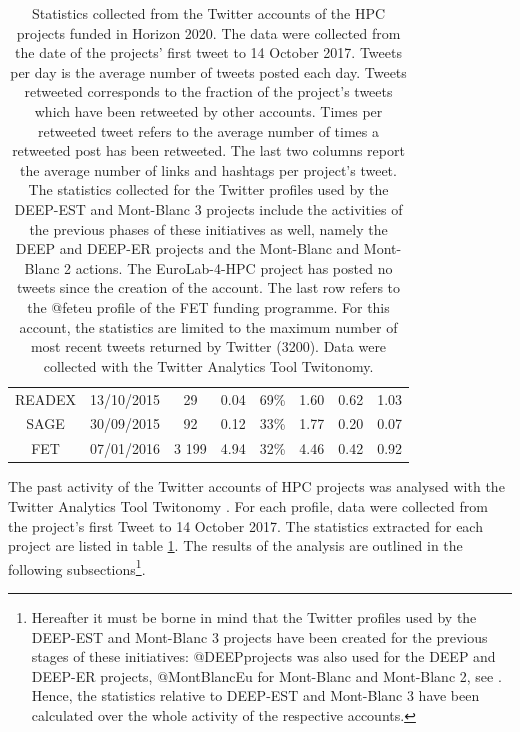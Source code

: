 {\begin{landscape}
\begin{table}
{\begin{tabular}{*{8}{c}}
       READEX & 13/10/2015 & 29 & 0.04 & 69\% & 1.60 & 0.62 & 1.03 \\
       SAGE & 30/09/2015 & 92 & 0.12 & 33\% & 1.77 & 0.20 & 0.07 \\ 
       FET & 07/01/2016 & 3 199 & 4.94 & 32\% & 4.46 & 0.42 & 0.92 \\
       \hline
       \hline
    \end{tabular}
   }     
   \caption{Statistics collected from the Twitter accounts of the HPC projects funded in Horizon 2020. The data were collected from the date of the projects' first tweet to 14 October 2017. Tweets per day is the average number of tweets posted each day. Tweets retweeted corresponds to the fraction of the project's tweets which have been retweeted by other accounts. Times per retweeted tweet refers to the average number of times a retweeted post has been retweeted. The last two columns report the average number of links and hashtags per project's tweet. The statistics collected for the Twitter profiles used by the DEEP-EST and Mont-Blanc 3 projects include the activities of the previous phases of these initiatives as well, namely the DEEP and DEEP-ER projects and the Mont-Blanc and Mont-Blanc 2 actions. The EuroLab-4-HPC project has posted no tweets since the creation of the account. The last row refers to the @fet\textunderscore eu profile of the FET funding programme. For this account, the statistics are limited to the maximum number of most recent tweets returned by Twitter (3200). Data were collected with the Twitter Analytics Tool Twitonomy.} \label{HPC_Twitter_activity}
   \end{table}
   \end{landscape}
 \clearpage
}

The past activity of the Twitter accounts of HPC projects was analysed with the Twitter Analytics Tool Twitonomy \cite{Twitonomy}. For each profile, data were collected from the project's first Tweet to 14 October 2017. The statistics extracted for each project are listed in table \ref{HPC_Twitter_activity}. The results of the analysis are outlined in the following subsections\footnote{Hereafter it must be borne in mind that the Twitter profiles used by the DEEP-EST and Mont-Blanc 3 projects have been created for the previous stages of these initiatives: @DEEPprojects was also used for the DEEP and DEEP-ER projects, @MontBlanc\textunderscore Eu for Mont-Blanc and Mont-Blanc 2, see \cite{DEEPprojects,MontBlanc}. Hence, the statistics relative to DEEP-EST and Mont-Blanc 3 have been calculated over the whole activity of the respective accounts.}.

